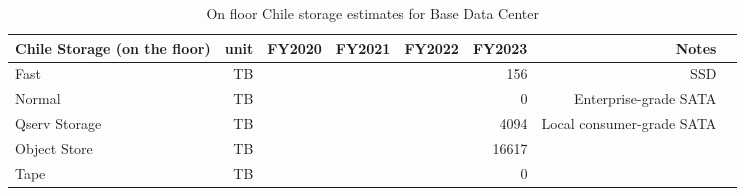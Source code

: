 \tiny \begin{longtable} { |p{}  |r  |r  |r  |r  |r  |r  |r |} 
\caption{On floor Chile storage estimates for Base Data Center \label{tab:chileStorage}}\\ 
\hline 
\textbf{Chile Storage (on the floor)}&\textbf{unit}&\textbf{FY2020}&\textbf{FY2021}&\textbf{FY2022}&\textbf{FY2023}&\textbf{Notes} \\ \hline
{Fast}&{TB}&{}&{}&{}&{156}&{SSD} \\ \hline
{Normal}&{TB}&{}&{}&{}&{0}&{Enterprise-grade SATA} \\ \hline
{Qserv Storage}&{TB}&{}&{}&{}&{4094}&{Local consumer-grade SATA} \\ \hline
{Object Store}&{TB}&{}&{}&{}&{16617}& \\ \hline
{Tape}&{TB}&{}&{}&{}&{0}& \\ \hline
\end{longtable} \normalsize
